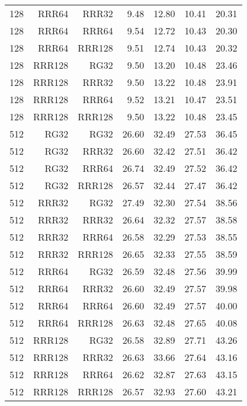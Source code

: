 \begin{table}
\begin{tabular}{|r|r|r|r|r|r|r|}
128 & RRR64 & RRR32 & 9.48 & 12.80 & 10.41 & 20.31 \\
128 & RRR64 & RRR64 & 9.54 & 12.72 & 10.43 & 20.30 \\
128 & RRR64 & RRR128 & 9.51 & 12.74 & 10.43 & 20.32 \\
128 & RRR128 & RG32 & 9.50 & 13.20 & 10.48 & 23.46 \\
128 & RRR128 & RRR32 & 9.50 & 13.22 & 10.48 & 23.91 \\
128 & RRR128 & RRR64 & 9.52 & 13.21 & 10.47 & 23.51 \\
128 & RRR128 & RRR128 & 9.50 & 13.22 & 10.48 & 23.45 \\
512 & RG32 & RG32 & 26.60 & 32.49 & 27.53 & 36.45 \\
512 & RG32 & RRR32 & 26.60 & 32.42 & 27.51 & 36.42 \\
512 & RG32 & RRR64 & 26.74 & 32.49 & 27.52 & 36.42 \\
512 & RG32 & RRR128 & 26.57 & 32.44 & 27.47 & 36.42 \\
512 & RRR32 & RG32 & 27.49 & 32.30 & 27.54 & 38.56 \\
512 & RRR32 & RRR32 & 26.64 & 32.32 & 27.57 & 38.58 \\
512 & RRR32 & RRR64 & 26.58 & 32.29 & 27.53 & 38.55 \\
512 & RRR32 & RRR128 & 26.65 & 32.33 & 27.55 & 38.59 \\
512 & RRR64 & RG32 & 26.59 & 32.48 & 27.56 & 39.99 \\
512 & RRR64 & RRR32 & 26.60 & 32.49 & 27.57 & 39.98 \\
512 & RRR64 & RRR64 & 26.60 & 32.49 & 27.57 & 40.00 \\
512 & RRR64 & RRR128 & 26.63 & 32.48 & 27.65 & 40.08 \\
512 & RRR128 & RG32 & 26.58 & 32.89 & 27.71 & 43.26 \\
512 & RRR128 & RRR32 & 26.63 & 33.66 & 27.64 & 43.16 \\
512 & RRR128 & RRR64 & 26.62 & 32.87 & 27.63 & 43.15 \\
512 & RRR128 & RRR128 & 26.57 & 32.93 & 27.60 & 43.21 \\
\hline
\end{tabular}
\end{table}

